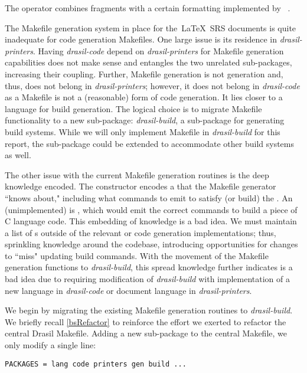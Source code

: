 {{{{{The operator \haskell{$+$} combines fragments with a certain formatting implemented by ~\cite{Hughes95thedesign}.

The Makefile generation system in place for the\ \LaTeX\ SRS documents is quite inadequate for code generation Makefiles. One large issue is its residence in \textit{drasil-printers}. Having \textit{drasil-code} depend on \textit{drasil-printers} for Makefile generation capabilities does not make sense and entangles the two unrelated sub-packages, increasing their coupling. Further, Makefile generation is not  generation and, thus, does not belong in \textit{drasil-printers}; however, it does not belong in \textit{drasil-code} as a Makefile is not a (reasonable) form of code generation. It lies closer to a language for build generation. The logical choice is to migrate Makefile functionality to a new sub-package: \textit{drasil-build}, a sub-package for generating build systems. While we will only implement Makefile in \textit{drasil-build} for this report, the sub-package could be extended to accommodate other build systems as well.

The other issue with the current Makefile generation routines is the deep knowledge encoded. The  constructor encodes a  that the Makefile generator ``knows about," including what commands to emit to satisfy (or build) the . An (unimplemented)  is , which would emit the correct commands to build a piece of C language code. This embedding of knowledge is a bad idea. We must maintain a list of s outside of the relevant  or code generation implementations; thus, sprinkling knowledge around the codebase, introducing opportunities for changes to ``miss" updating build commands. With the movement of the Makefile generation functions to \textit{drasil-build}, this spread knowledge further indicates  is a bad idea due to requiring modification of \textit{drasil-build} with implementation of a new language in \textit{drasil-code} or document language in \textit{drasil-printers}.

We begin by migrating the existing Makefile generation routines to \textit{drasil-build}. We briefly recall \autoref{bsRefactor} to reinforce the effort we exerted to refactor the central Drasil Makefile. Adding a new sub-package to the central Makefile, we only modify a single line:

\begin{tcolorbox}
\begin{verbatim}
PACKAGES = lang code printers gen build ...
\end{verbatim}
\end{tcolorbox}

}}}}}

